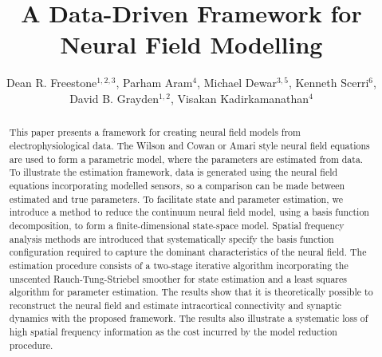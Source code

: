 \documentclass[12pt]{iopart}
\begin{document}
\title[A Data-Driven Framework for Neural Field Modelling]{A Data-Driven Framework for Neural Field Modelling}

\author{Dean R. Freestone$^{1,2,3}$, 
Parham Aram$^{4}$, 
Michael Dewar$^{3,5}$,
Kenneth Scerri$^{6}$,
David B. Grayden$^{1,2}$,
Visakan Kadirkamanathan$^{4}$}

\address{$^1$ Department of Electrical and Electronic Engineering, University of Melbourne, Melbourne, VIC, Australia
\\
$^2$ The Bionic Ear Institute, East Melbourne, VIC, Australia
\\
$^3$ Institute for Adaptive and Neural Computation, University of Edinburgh, Edinburgh, UK
\\
$^4$ Department of Automatic Control and Systems Engineering, University of Sheffield, Sheffield, UK
\\
$^5$ Department of Applied Physics and Applied Mathematics, Columbia University, New York, NY, USA
\\
$^6$ Department of Systems and Control Engineering, University of Malta, Msida, MSD, Malta}



\begin{abstract}
This paper presents a framework for creating neural field models from electrophysiological data. The Wilson and Cowan or Amari style neural field equations are used to form a parametric model, where the parameters are estimated from data. To illustrate the estimation framework, data is generated using the neural field equations incorporating modelled sensors, so a comparison can be made between estimated and true parameters. To facilitate state and parameter estimation, we introduce a method to reduce the continuum neural field model, using a basis function decomposition, to form a finite-dimensional state-space model. Spatial frequency analysis methods are introduced that systematically specify the basis function configuration required to capture the dominant characteristics of the neural field. The estimation procedure consists of a two-stage iterative algorithm incorporating the unscented Rauch-Tung-Striebel smoother for state estimation and a least squares algorithm for parameter estimation. The results show that it is theoretically possible to reconstruct the neural field and estimate intracortical connectivity and synaptic dynamics with the proposed framework. The results also illustrate a systematic loss of high spatial frequency information as the cost incurred by the model reduction procedure. 
\end{abstract}
\end{document}
